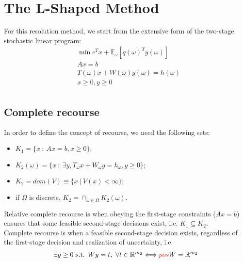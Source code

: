 \documentclass[12pt, openany]{report}
\newcommand{\R}{\mathbb{R}}
\newcommand{\E}{\mathbb{E}}
\theoremstyle{definition}
\begin{document}
\chapter{The L-Shaped Method}
For this resolution method, we start from the extensive form of the two-stage stochastic linear program:
\begin{equation}\label{eq:EF}
    \begin{aligned}
        &\min c^T x + \E_\omega[q(\omega)^T y(\omega)]\\
        &Ax = b\\
        &T(\omega)x + W(\omega)y(\omega) = h(\omega)\\
        &x\ge 0,y\ge 0\\
    \end{aligned}
\end{equation}
\section{Complete recourse}
In order to define the concept of recourse, we need the following sets:
\begin{itemize}
    \item $K_1 = \{x\ : \ Ax=b,x\ge 0\}$;
    \item $K_2 (\omega) = \{x\ : \ \exists y ,T_\omega x + W_\omega y = h_\omega,y\ge 0\}$;
    \item $K_2 = dom(V)\equiv \{x \ | \ V(x)<\infty\}$;
    \item if $\Omega$ is discrete, $K_2 = \cap_{\omega\in \Omega}K_2(\omega)$.
\end{itemize}
Relative complete recourse is when obeying the first-stage constraints ($Ax=b$) ensures that some feasible second-stage decisions exist, i.e. $K_1\subseteq K_2$.\\
Complete recourse is when a feasible second-stage decision exists, regardless of the first-stage decision and realization of uncertainty, i.e.
\begin{equation}
    \exists y\ge 0\text{ s.t. }Wy=t, \ \forall t\in \R^{m_2} \Longleftrightarrow \textcolor{red}{pos} W=\R^{m_2}
\end{equation}
\end{document}
